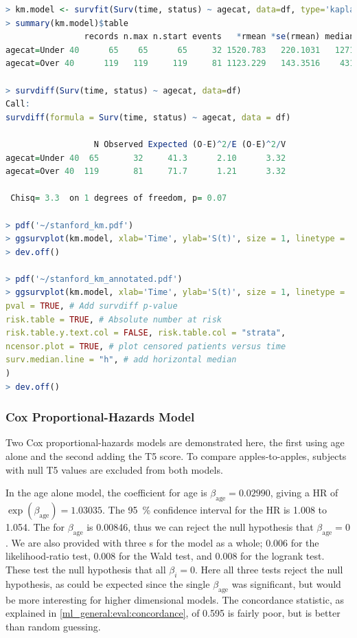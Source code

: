 \begin{lstlisting}[language=R]
> km.model <- survfit(Surv(time, status) ~ agecat, data=df, type='kaplan-meier')
> summary(km.model)$table
                records n.max n.start events   *rmean *se(rmean) median 0.95LCL 0.95UCL
agecat=Under 40      65    65      65     32 1520.783   220.1031   1271     731      NA
agecat=Over 40      119   119     119     81 1123.229   143.3516    431     202     897

> survdiff(Surv(time, status) ~ agecat, data=df)
Call:
survdiff(formula = Surv(time, status) ~ agecat, data = df)

                  N Observed Expected (O-E)^2/E (O-E)^2/V
agecat=Under 40  65       32     41.3      2.10      3.32
agecat=Over 40  119       81     71.7      1.21      3.32

 Chisq= 3.3  on 1 degrees of freedom, p= 0.07

> pdf('~/stanford_km.pdf')
> ggsurvplot(km.model, xlab='Time', ylab='S(t)', size = 1, linetype = 'strata', palette=c('#4e79a7', '#f28e2b'), conf.int = TRUE, legend = c(0.85, 0.85), legend.y = 1, legend.title = '', legend.labs = c('Under 40', 'Over 40'))
> dev.off()

> pdf('~/stanford_km_annotated.pdf')
> ggsurvplot(km.model, xlab='Time', ylab='S(t)', size = 1, linetype = 'strata', palette=c('#4e79a7', '#f28e2b'), conf.int = TRUE, legend = c(0.85, 0.85), legend.y = 1, legend.title = '', legend.labs = c('Under 40', 'Over 40'),
pval = TRUE, # Add survdiff p-value
risk.table = TRUE, # Absolute number at risk
risk.table.y.text.col = FALSE, risk.table.col = "strata",
ncensor.plot = TRUE, # plot censored patients versus time
surv.median.line = "h", # add horizontal median
)
> dev.off()
\end{lstlisting}

\subsubsection{Cox Proportional-Hazards Model}
\label{survival:Rcode:cox}

Two Cox proportional-hazards models are demonstrated here,
the first using age alone and the second adding the T5 score.
To compare apples-to-apples, subjects with null T5 values are excluded from both models.

In the age alone model, the coefficient for age is
$\beta_{\text{age}} = \num{0.02990}$, giving a HR of
$\exp\left(\beta_{\text{age}}\right) = \num{1.03035}$.
The \SI{95}{\percent} confidence interval for the HR is {1.008} to \num{1.054}.
The \pvalue for $\beta_{\text{age}}$ is \num{0.00846},
thus we can reject the null hypothesis that $\beta_{\text{age}} = 0$.
We are also provided with three {\pvalue}s for the model as a whole;
\num{0.006} for the likelihood-ratio test,
\num{0.008} for the Wald test,
and \num{0.008} for the logrank test.
These test the null hypothesis that all $\beta_{i} = 0$.
Here all three tests reject the null hypothesis,
as could be expected since the single $\beta_{\text{age}}$ was significant,
but would be more interesting for higher dimensional models.
The concordance statistic, as explained in \cref{ml_general:eval:concordance},
of \num{0.595} is fairly poor, but is better than random guessing.

